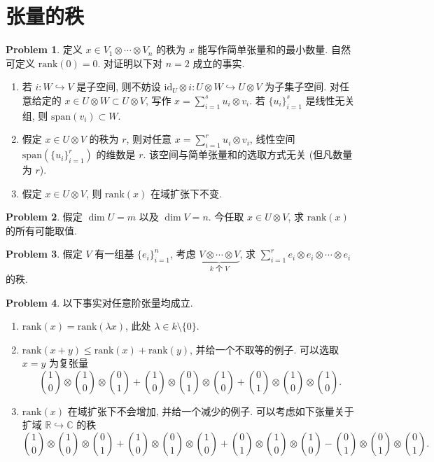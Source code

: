 \documentclass{MainStyle}
\theoremstyle{definition}
\newtheorem{problem}{Problem}
\begin{document}
\newpage

\section{张量的秩}

\begin{problem}
定义 $x\in V_1\otimes \cdots \otimes V_n$ 的秩为 $x$ 能写作简单张量和的最小数量. 自然可定义 $\mathrm{rank}(0)=0$. 对证明以下对 $n=2$ 成立的事实.
\begin{enumerate}
    \item 若 $i:W\hookrightarrow V$ 是子空间, 则不妨设 $\mathrm{id}_U\otimes i:U\otimes W\hookrightarrow U\otimes V$ 为子集子空间. 对任意给定的 $x\in U\otimes W\subset U\otimes V$, 写作 $x=\sum_{i=1}^s u_i\otimes v_i$. 若 $\{u_i\}_{i=1}^s$ 是线性无关组, 则 $\mathrm{span}(v_i)\subset W$.
    \item 假定 $x\in U\otimes V$ 的秩为 $r$, 则对任意 $x=\sum_{i=1}^r u_i\otimes v_i$, 线性空间 $\mathrm{span}(\{u_i\}_{i=1}^r)$ 的维数是 $r$. 该空间与简单张量和的选取方式无关 (但凡数量为 $r$).
    \item 假定 $x\in U\otimes V$, 则 $\mathrm{rank}(x)$ 在域扩张下不变.
\end{enumerate}
\end{problem}

\begin{problem}
假定 $\dim U=m$ 以及 $\dim V=n$. 今任取 $x\in U\otimes V$, 求 $\mathrm{rank}(x)$ 的所有可能取值.
\end{problem}

\begin{problem}
假定 $V$ 有一组基 $\{e_i\}_{i=1}^n$, 考虑 $\underset{k\text{ 个 }V}{\underbrace{V\otimes \cdots\otimes V}}$, 求 $\sum_{i=1}^r e_i\otimes e_i\otimes \cdots \otimes e_i$ 的秩.
\end{problem}

\begin{problem}
以下事实对任意阶张量均成立.
\begin{enumerate}
    \item $\mathrm{rank}(x)=\mathrm{rank}(\lambda x)$, 此处 $\lambda\in k\setminus \{0\}$.
    \item $\mathrm{rank}(x+y)\leq \mathrm{rank}(x)+\mathrm{rank}(y)$, 并给一个不取等的例子. 可以选取 $x=y$ 为复张量
          \begin{equation}
              \binom10\otimes \binom10\otimes \binom01+\binom10\otimes \binom01\otimes \binom10+\binom01\otimes \binom10\otimes \binom10.
          \end{equation}
    \item $\mathrm{rank}(x)$ 在域扩张下不会增加, 并给一个减少的例子. 可以考虑如下张量关于扩域 $\mathbb R\hookrightarrow \mathbb C$ 的秩
          \begin{equation}
              \binom10\otimes \binom10\otimes \binom01+\binom10\otimes \binom01\otimes \binom10+\binom01\otimes \binom10\otimes \binom10-\binom01\otimes \binom01\otimes \binom01.
          \end{equation}
\end{enumerate}

\end{problem}
\end{document}
